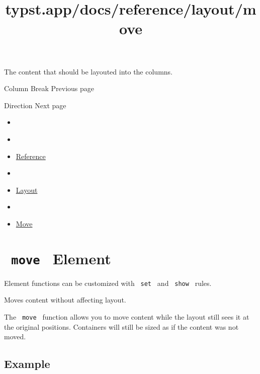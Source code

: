 The content that should be layouted into the columns.

\href{/docs/reference/layout/colbreak/}{\pandocbounded{}}

{ Column Break } { Previous page }

\href{/docs/reference/layout/direction/}{\pandocbounded{}}

{ Direction } { Next page }


\title{typst.app/docs/reference/layout/move}

\begin{itemize}
\tightlist
\item
  \href{/docs}{}
\item
  
\item
  \href{/docs/reference/}{Reference}
\item
  
\item
  \href{/docs/reference/layout/}{Layout}
\item
  
\item
  \href{/docs/reference/layout/move/}{Move}
\end{itemize}

\section{\texorpdfstring{\texttt{\ move\ } {{ Element
}}}{ move   Element }}\label{summary}

\label{element-tooltip}
Element functions can be customized with \texttt{\ set\ } and
\texttt{\ show\ } rules.

Moves content without affecting layout.

The \texttt{\ move\ } function allows you to move content while the
layout still \textquotesingle sees\textquotesingle{} it at the original
positions. Containers will still be sized as if the content was not
moved.

\subsection{Example}\label{example}

